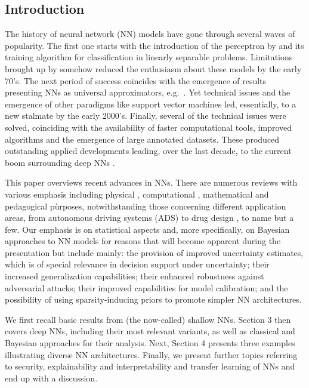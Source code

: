 
\subsection{Introduction}

The history of neural network (NN) models have gone 
through several waves of popularity. The first 
one starts with the introduction of the perceptron
by \parencite{rosenblatt1958perceptron} and its training algorithm 
for classification in linearly separable problems.
Limitations brought up by 
\parencite{minsky} somehow reduced the enthusiasm
about these models by the early 70's.
The next period of success coincides with the emergence
of results presenting NNs as universal
approximators, e.g.\ \parencite{cybenko1989approximation}. Yet 
technical issues and the emergence of other paradigms like 
support vector machines led, essentially,
to a new stalmate by the early 2000's. Finally, several of the 
technical issues were solved, coinciding with the 
availability of faster computational tools,
improved algorithms and the emergence of
large annotated datasets. These produced outstanding 
applied developments leading, over the last decade, to the current boom 
surrounding deep NNs \parencite{deeplearningbook}. 

This paper overviews  
recent advances in NNs. 
There are numerous reviews with various emphasis 
including physical \parencite{cirac}, computational \parencite{chollet}, mathematical \parencite{maths} and pedagogical \parencite{teach} pùrposes, 
notwithstanding  those concerning different  application areas, 
from autonomous driving systems (ADS) \parencite{rumanos} to
drug design \parencite{hessler}, to name but a few. 
Our emphasis is on statistical
aspects and, more specifically, on Bayesian approaches
to NN models for reasons that will become 
apparent during the presentation but include mainly:
the provision of improved uncertainty estimates, which is
of special relevance in decision support under uncertainty; their 
increased generalization capabilities; their 
enhanced robustness against adversarial attacks; 
their improved capabilities for model calibration;
and the possibility of using sparsity-inducing priors
to promote simpler NN architectures.

We first recall basic results from (the now-called) 
shallow NNs.
Section 3 then covers deep NNs, including their most
relevant 
variants, as well as classical and Bayesian approaches
for their analysis. Next, Section 4
presents three examples illustrating
diverse NN architectures. Finally, we present 
further topics referring to security, explainability and
interpretability and transfer 
learning of NNs and end up with a discussion.

